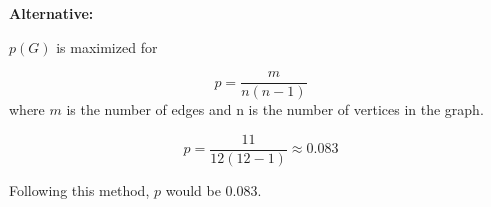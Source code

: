 \begin{enumerate}
	
\textbf{Alternative:}

$p(G)$ is maximized for 

\begin{equation}
p = \frac{m}{n(n-1)}
\end{equation}
where $m$ is the number of edges and n is the number of vertices in the graph.

\begin{equation}
p = \frac{11}{12(12-1)} \approx 0.083
\end{equation}

Following this method,  $p$ would be $0.083$.
	
	
	
\end{enumerate}